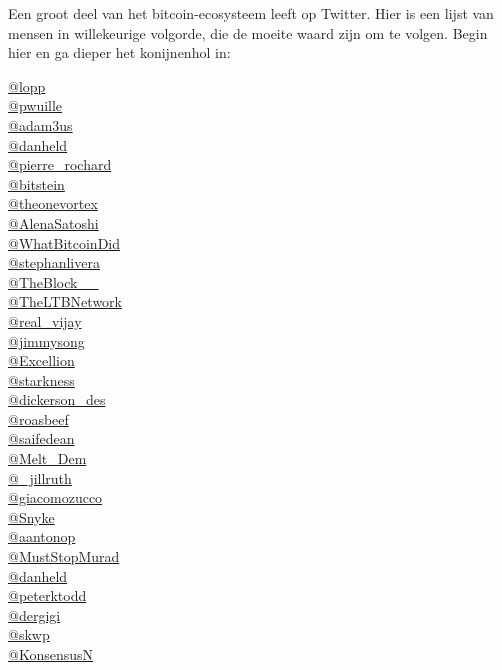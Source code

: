 \documentclass[
  letterpaper,
]{scrbook}
\begin{document}
Een groot deel van het bitcoin-ecosysteem leeft op Twitter. Hier is een
lijst van mensen in willekeurige volgorde, die de moeite waard zijn om
te volgen. Begin hier en ga dieper het konijnenhol in:

\href{https://twitter.com/lopp}{@lopp}\\
\href{https://twitter.com/pwuille}{@pwuille}\\
\href{https://twitter.com/adam3us}{@adam3us}\\
\href{https://twitter.com/danheld}{@danheld}\\
\href{https://twitter.com/pierre_rochard}{@pierre\_rochard}\\
\href{https://twitter.com/bitstein}{@bitstein}\\
\href{https://twitter.com/theonevortex}{@theonevortex}\\
\href{https://twitter.com/AlenaSatoshi}{@AlenaSatoshi}\\
\href{https://twitter.com/WhatBitcoinDid}{@WhatBitcoinDid}\\
\href{https://twitter.com/stephanlivera}{@stephanlivera}\\
\href{https://twitter.com/TheBlock__}{@TheBlock\_\_}\\
\href{https://twitter.com/TheLTBNetwork}{@TheLTBNetwork}\\
\href{https://twitter.com/real_vijay}{@real\_vijay}\\
\href{https://twitter.com/jimmysong}{@jimmysong}\\
\href{https://twitter.com/Excellion}{@Excellion}\\
\href{https://twitter.com/starkness}{@starkness}\\
\href{https://twitter.com/dickerson_des}{@dickerson\_des}\\
\href{https://twitter.com/roasbeef}{@roasbeef}\\
\href{https://twitter.com/saifedean}{@saifedean}\\
\href{https://twitter.com/Melt_Dem}{@Melt\_Dem}\\
\href{https://twitter.com/_jillruth}{@\_jillruth}\\
\href{https://twitter.com/giacomozucco}{@giacomozucco}\\
\href{https://twitter.com/Snyke}{@Snyke}\\
\href{https://twitter.com/aantonop}{@aantonop}\\
\href{https://twitter.com/MustStopMurad}{@MustStopMurad}\\
\href{https://twitter.com/danheld}{@danheld}\\
\href{https://twitter.com/peterktodd}{@peterktodd}\\
\href{https://twitter.com/dergigi}{@dergigi}\\
\href{https://twitter.com/skwp}{@skwp}\\
\href{https://twitter.com/konsensusn}{@KonsensusN}
\end{document}
